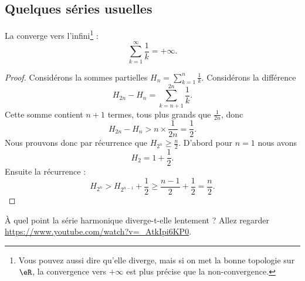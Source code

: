 \subsection{Quelques séries usuelles}
\label{SUBSECooDTYHooZjXXJf}

\begin{proposition}       \label{PROPooBAIWooKxMLvh}
    La  converge vers l'infini\footnote{Vous pouvez aussi dire qu'elle diverge, mais si on met la bonne topologie sur \( \eR\), la convergence vers \( +\infty\) est plus précise que la non-convergence.} :
    \begin{equation}
		\sum_{k=1}^\infty \frac{1}{ k }=+\infty.
    \end{equation}
\end{proposition}

\begin{proof}
    Considérons la sommes partielles \( H_n=\sum_{k=1}^n\frac{1}{ k }\). Considérons la différence 
    \begin{equation}
        H_{2n}-H_n=\sum_{k=n+1}^{2n}\frac{1}{ k }.
    \end{equation}
    Cette somme contient \( n+1\) termes, tous plus grands que \( \frac{1}{ 2n }\), donc
    \begin{equation}
        H_{2n}-H_n > n\times\frac{1}{ 2n }=\frac{ 1 }{2}.
    \end{equation}
    Nous prouvons donc par récurrence que \( H_{2^n}\geq \frac{ n }{2}\). D'abord pour \( n=1\) nous avons
    \begin{equation}
        H_2=1+\frac{ 1 }{2}.
    \end{equation}
    Ensuite la récurrence :
    \begin{equation}
        H_{2^n}>H_{2^{n-1}}+\frac{ 1 }{2}\geq \frac{ n-1 }{ 2 }+\frac{ 1 }{2}=\frac{ n }{2}.
    \end{equation}
\end{proof}

\begin{normaltext}
    À quel point la série harmonique diverge-t-elle lentement ? Allez regarder\\ \url{https://www.youtube.com/watch?v=_AtkIpi6KP0}.
\end{normaltext}


